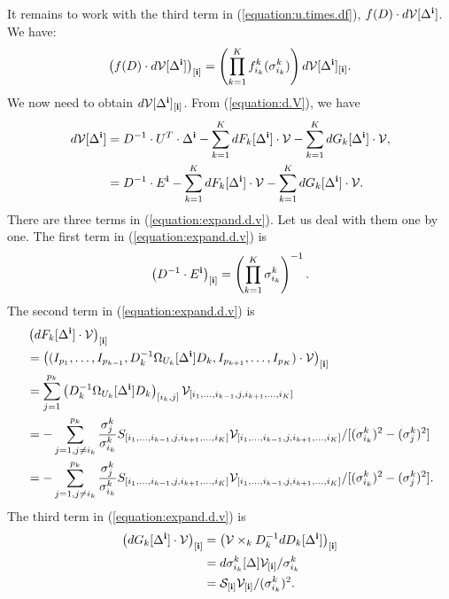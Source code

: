 It remains to work with the third term in (\ref{equation:u.times.df}),
$f(D) \cdot d\mathcal{V}[\Delta^{\bf i}]$.
We have:
\begin{align}
\left(f(D) \cdot d\mathcal{V}[\Delta^{\bf i}]\right)_{[\mathbf{i}]} = \left(\prod_{k=1}^Kf_{i_k}^k(\sigma_{i_k}^k)\right) d\mathcal{V}[\Delta^{\bf i}]_{[\mathbf{i}]}. \label{eqaution:element.of.f.dv}
\end{align}
We now need to obtain $d\mathcal{V}[\Delta^{\bf i}]_{[\mathbf{i}]}$. From (\ref{equation:d.V}), we have
\begin{align}
d\mathcal{V}[\Delta^{\bf i}] &= D^{-1} \cdot U^T \cdot \Delta^{\bf i} - \sum_{k=1}^K dF_k[\Delta^{\bf i}]\cdot \mathcal{V} - \sum_{k=1}^K dG_k[\Delta^{\bf i}] \cdot \mathcal{V},\nonumber\\
&= D^{-1} \cdot E^{\bf i} - \sum_{k=1}^K dF_k[\Delta^{\bf i}]\cdot \mathcal{V} - \sum_{k=1}^K dG_k[\Delta^{\bf i}] \cdot \mathcal{V}.\label{equation:expand.d.v}
\end{align}
There are three terms in (\ref{equation:expand.d.v}). Let us deal with them one by one. The first term in (\ref{equation:expand.d.v}) is
\begin{align}
\left(D^{-1} \cdot E^{\bf i}\right)_{[\mathbf{i}]} = \left(\prod_{k=1}^K\sigma_{i_k}^k\right)^{-1}.\label{equation:dv.1}
\end{align}
The second term in (\ref{equation:expand.d.v}) is
\begin{align}
&\left( dF_k[\Delta^{\bf i}]\cdot \mathcal{V}\right)_{[\mathbf{i}]} \nonumber\\
&= \left((I_{p_1},\ldots,I_{p_{k-1}},D_k^{-1}\Omega_{U_k}[\Delta^{\bf i}]D_k,I_{p_{k+1}},\ldots,I_{p_K})\cdot \mathcal{V}\right)_{[\mathbf{i}]}\nonumber\\
&= \sum_{j=1}^{p_k}\left(D_k^{-1}\Omega_{U_k}[\Delta^{\bf i}]D_k\right)_{[i_k,j]} \mathcal{V}_{[i_1,\ldots,i_{k-1},j,i_{k+1},\ldots,i_K]}\nonumber\\
&= -\sum_{j=1, j\neq i_k}^{p_k}\frac{\sigma_j^k}{\sigma_{i_k}^k}S_{[i_1,\ldots,i_{k-1},j,i_{k+1},\ldots,i_K]}\mathcal{V}_{[i_1,\ldots,i_{k-1},j,i_{k+1},\ldots,i_K]}/[(\sigma_{i_k}^k)^2 - (\sigma_j^k)^2]\nonumber\\
&= -\sum_{j=1, j\neq i_k}^{p_k}\frac{\sigma_j^k}{\sigma_{i_k}^k}S_{[i_1,\ldots,i_{k-1},j,i_{k+1},\ldots,i_K]}\mathcal{V}_{[i_1,\ldots,i_{k-1},j,i_{k+1},\ldots,i_K]}/[(\sigma_{i_k}^k)^2 - (\sigma_j^k)^2]. \label{equation:dv.2}
\end{align}
The third term in (\ref{equation:expand.d.v}) is
\begin{align}
\left(dG_k[\Delta^{\bf i}] \cdot \mathcal{V}\right)_{[\mathbf{i}]} &= \left(\mathcal{V} \times_k D_k^{-1}dD_k[\Delta^{\bf i}]\right)_{[\mathbf{i}]}\nonumber\\
&= d\sigma_{i_k}^k[\Delta] \mathcal{V}_{[\mathbf{i}]}/\sigma_{i_k}^k\nonumber\\
&= \mathcal{S}_{[\mathbf{i}]}\mathcal{V}_{[\mathbf{i}]}/(\sigma_{i_k}^k)^2.\label{equation:dv.3}
\end{align}
